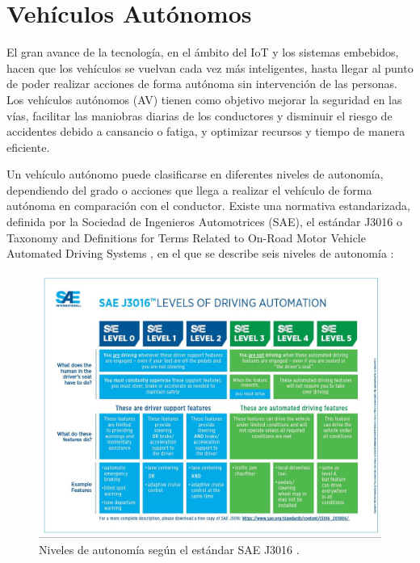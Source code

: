 \documentclass[12pt]{report} %
\begin{document}
\section{Vehículos Autónomos}

El gran avance de la tecnología, en el ámbito del IoT y los sistemas embebidos, hacen que los vehículos se vuelvan cada vez más inteligentes, hasta llegar al punto de poder realizar acciones de forma autónoma sin intervención de las personas. Los vehículos autónomos (AV) tienen como objetivo mejorar la seguridad en las vías, facilitar las maniobras diarias de los conductores y disminuir el riesgo de accidentes debido a cansancio o fatiga, y optimizar recursos y tiempo de manera eficiente.
\cite{autonomousVehicles2}

Un vehículo autónomo puede clasificarse en diferentes niveles de autonomía, dependiendo del grado o acciones que llega a realizar el vehículo de forma autónoma en comparación con el conductor. Existe una normativa estandarizada, definida por la Sociedad de Ingenieros Automotrices (SAE), el estándar J3016 o Taxonomy and Definitions for Terms Related to On-Road Motor Vehicle Automated Driving Systems \cite{sae}, en el que se describe seis niveles de autonomía 
\cite{autonomousVehicles}:

\begin{figure}[H]
	\centering
	\includegraphics[width=\textwidth]{saeLevels.jpg}
	\caption{Niveles de autonomía según el estándar SAE J3016 \cite{autonomousVehicles}.}
	\label{fig:imagen19}
\end{figure}
\end{document}
